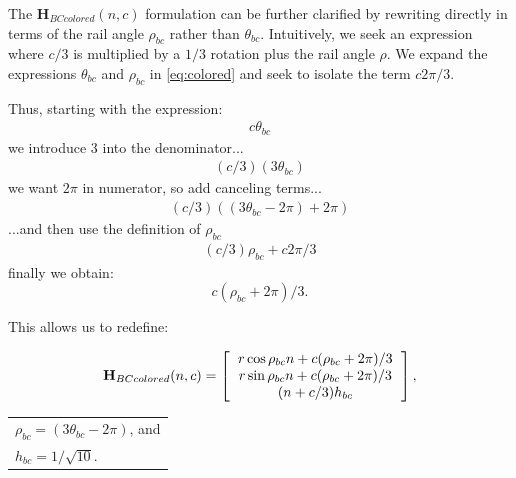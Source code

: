 \documentclass[twocolumn,10pt]{asme2ej}
\renewcommand{\vec}[1]{\mathbf{#1}}
\begin{document}
The $\vec{H}_{BCcolored}(n,c)$ formulation can be further clarified by rewriting directly in terms of the rail angle $\rho_{bc}$ rather than $\theta_{bc}$.
Intuitively, we seek an expression where $c/3$ is multiplied by a $1/3$ rotation plus the rail angle $\rho$.
We expand 
the expressions $\theta_{bc}$ and $\rho_{bc}$ in \cref{eq:colored} and seek to isolate the term $c 2\pi/3 $.




Thus, starting with the expression:
\begin{align*}
  c \theta_{bc} 
\end{align*}
we introduce 3 into the denominator...
\begin{align*}
  (c/3)  (3 \theta_{bc}) 
\end{align*}
we want $2\pi$ in numerator, so add canceling terms...
\begin{align*}
  (c/ 3) ((3 \theta_{bc} - 2 \pi)  + 2 \pi) 
\end{align*}
...and then use the definition of $\rho_{bc}$
\begin{align*}
  (c / 3) \rho_{bc}  + c 2 \pi /3 
\end{align*}
finally we obtain:
\begin{equation}
  c  ( \rho_{bc} +  2 \pi) /3  \text{.}
\end{equation}  

This allows us to redefine:

\begin{equation}
\vec{H}_{BCcolored}(n,c) =
\left [
  \begin{tabular}{c}
    $ r  \cos{\rho_{bc} n + c (\rho_{bc} +  2 \pi) /3} $\\
   $ r  \sin{\rho_{bc} n + c (\rho_{bc} +  2 \pi) /3} $\\
   $ (n+c/3)  h_{bc} $
  \end{tabular}
  \right ],
\end{equation}
  \begin{tabular}{l}
    $\rho_{bc} = (3 \theta_{bc} - 2 \pi)$, and \\
    $ h_{bc} = 1/\sqrt{10} $. \\    
  \end{tabular}      
\end{document}
